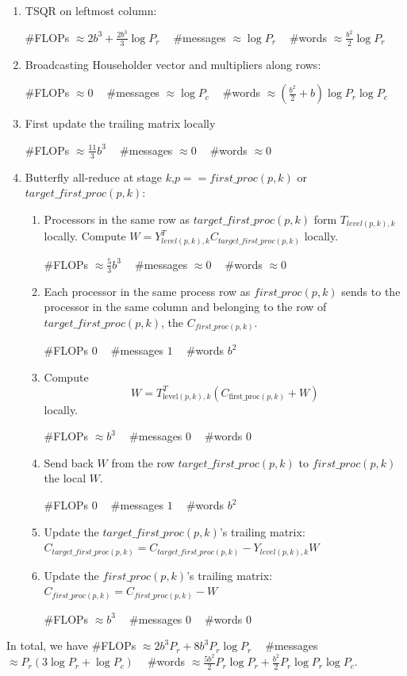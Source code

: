 \documentclass{article}
\begin{document}
\begin{enumerate}
	\item TSQR on leftmost column: 
	
	\#FLOPs  $\approx 2b^3+ \frac{2b^3}{3} \log P_r~~~~$    \#messages  $\approx \log P_r~~~~$
		\#words $\approx \frac{b^2}{2} \log P_r$
	
	\item Broadcasting Householder vector and multipliers along rows: 
	
	
		\#FLOPs  $\approx 0~~~~$
		\#messages  $\approx \log P_c~~~~$
	\#words $\approx (\frac{b^2}{2} + b) \log P_r \log P_c$
	\item First update the trailing matrix locally
	
		\#FLOPs  $\approx \frac{11}{3}b^3~~~~$
	\#messages  $\approx 0~~~~$
	\#words $\approx 0$
	\item Butterfly all-reduce at stage $k$,$p==first\_proc(p,k)$ or $target\_first\_proc(p,k)$:
	 \begin{enumerate}
	 	\item  Processors in the same row as $target\_first\_proc(p,k)$ form $T_{level(p,k),k}$ locally. Compute $W = Y^T_{level(p,k),k}C_{target\_first\_proc(p,k)}$ locally. 
	 	
	 			\#FLOPs  $\approx \frac{5}{3}b^3~~~~$
	 	\#messages  $\approx 0~~~~$
	 	\#words $\approx 0$
	 	
	 	\item  Each processor in the same process row as $first\_proc(p,k)$ sends to the processor in the same column and belonging to the row of $target\_first\_proc(p,k)$, the $C_{first\_proc(p,k)}$.
	 	
	 		 			\#FLOPs  $0~~~~$
	 	\#messages  $1~~~~$
	 	\#words $b^2$
	 	\item  Compute \begin{equation}W=T_{\text {level}(p, k), k}^{T}\left(C_{\text {first\_ {proc}}(p, k)}+W\right)\end{equation} locally.
	 	
	 	\#FLOPs  $\approx b^3~~~~$
	 	\#messages  $0~~~~$
	 	\#words $0$
	 	\item  Send back $W$ from the row $target\_first\_proc(p,k)$ to $first\_proc(p,k)$ the local $W$.
	 	
	 		 	\#FLOPs  $0~~~~$
	 	\#messages  $1~~~~$
	 	\#words $b^2$
	 	\item Update the $target\_first\_proc(p,k)$'s trailing matrix: $C_{target\_first\_proc(p,k)} = C_{target\_first\_proc(p,k)} - Y_{level(p,k),k}W$
	 	\item  Update the $first\_proc(p,k)$'s trailing matrix: $C_{first\_proc(p,k)} = C_{first\_proc(p,k)} - W$
	 	
	 	\#FLOPs  $\approx b^3~~~~$
	 	\#messages  $0~~~~$
	 	\#words $0$
	 \end{enumerate}
\end{enumerate}
In total, we have 
	 	\#FLOPs  $\approx 2b^3P_r + 8b^3P_r\log P_r~~~~$
\#messages  $\approx P_r(3\log P_r + \log P_c)~~~~$
\#words $\approx \frac{5b^2}{2} P_r\log P_r + \frac{b^2}{2} P_r \log P_r \log P_c$.
\end{document}

